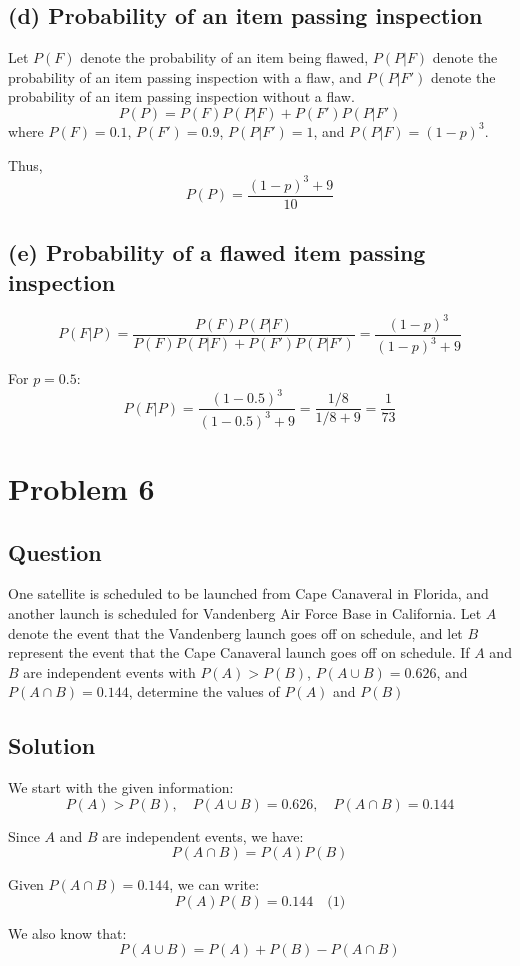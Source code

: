 \documentclass{article}
\begin{document}
\subsection*{(d) Probability of an item passing inspection}
Let $P(F)$ denote the probability of an item being flawed, $P(P|F)$ denote the probability of an item passing inspection with a flaw, and $P(P|F')$ denote the probability of an item passing inspection without a flaw.
\[
P(P) = P(F)P(P|F) + P(F')P(P|F')
\]
where $P(F) = 0.1$, $P(F') = 0.9$, $P(P|F') = 1$, and $P(P|F) = (1-p)^3$.

Thus,
\[
P(P) = \frac{(1-p)^3 + 9}{10}
\]

\subsection*{(e) Probability of a flawed item passing inspection}
\[
P(F|P) = \frac{P(F)P(P|F)}{P(F)P(P|F) + P(F')P(P|F')} = \frac{(1-p)^3}{(1-p)^3 + 9}
\]

For $p = 0.5$:
\[
P(F|P) = \frac{(1-0.5)^3}{(1-0.5)^3 + 9} = \frac{1/8}{1/8 + 9} = \frac{1}{73}
\]
\section*{Problem 6}
\subsection*{Question}
One satellite is scheduled to be launched from Cape Canaveral in Florida, and another launch is scheduled for Vandenberg Air Force Base in California. Let $A$ denote the event that the Vandenberg launch goes off on schedule, and let $B$ represent the event that the Cape Canaveral launch goes off on schedule. If $A$ and $B$ are independent events with $P(A) > P(B)$, $P(A \cup B) = 0.626$, and $P(A \cap B) = 0.144$, determine the values of $P(A)$ and $P(B)$
\subsection*{Solution}

We start with the given information:
\[
P(A) > P(B), \quad P(A \cup B) = 0.626, \quad P(A \cap B) = 0.144
\]

Since $A$ and $B$ are independent events, we have:
\[
P(A \cap B) = P(A)P(B)
\]

Given $P(A \cap B) = 0.144$, we can write:
\[
P(A)P(B) = 0.144 \quad \text{(1)}
\]

We also know that:
\[
P(A \cup B) = P(A) + P(B) - P(A \cap B)
\]
\end{document}
